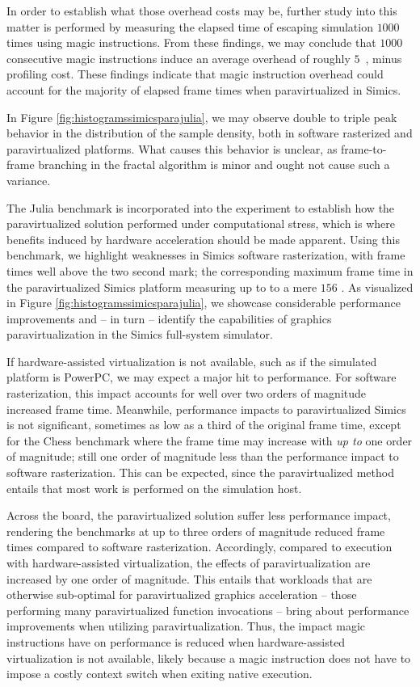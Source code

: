 \documentclass{article}
\begin{document}
In order to establish what those overhead costs may be, further study into this matter is performed by measuring the elapsed time of escaping simulation $1000$ times using magic instructions.
From these findings, we may conclude that $1000$ consecutive magic instructions induce an average overhead of roughly $5$~\milli\second , minus profiling cost.
These findings indicate that magic instruction overhead could account for the majority of elapsed frame times when paravirtualized in Simics.

In Figure \ref{fig:histogramssimicsparajulia}, we may observe double to triple peak behavior in the distribution of the sample density, both in software rasterized and paravirtualized platforms.
What causes this behavior is unclear, as frame-to-frame branching in the fractal algorithm is minor and ought not cause such a variance.

The Julia benchmark is incorporated into the experiment to establish how the paravirtualized solution performed under computational stress, which is where benefits induced by hardware acceleration should be made apparent.
Using this benchmark, we highlight weaknesses in Simics software rasterization, with frame times well above the two second mark; the corresponding maximum frame time in the paravirtualized Simics platform measuring up to to a mere $156$ \milli\second .
As visualized in Figure \ref{fig:histogramssimicsparajulia}, we showcase considerable performance improvements and -- in turn -- identify the capabilities of graphics paravirtualization in the Simics full-system simulator.

If hardware-assisted virtualization is not available, such as if the simulated platform is PowerPC, we may expect a major hit to performance.
For software rasterization, this impact accounts for well over two orders of magnitude increased frame time.
Meanwhile, performance impacts to paravirtualized Simics is not significant, sometimes as low as a third of the original frame time, except for the Chess benchmark where the frame time may increase with \textit{up to} one order of magnitude; still one order of magnitude less than the performance impact to software rasterization.
This can be expected, since the paravirtualized method entails that most work is performed on the simulation host.

Across the board, the paravirtualized solution suffer less performance impact, rendering the benchmarks at up to three orders of magnitude reduced frame times compared to software rasterization.
Accordingly, compared to execution with hardware-assisted virtualization, the effects of paravirtualization are increased by one order of magnitude.
This entails that workloads that are otherwise sub-optimal for paravirtualized graphics acceleration -- those performing many paravirtualized function invocations -- bring about performance improvements when utilizing paravirtualization.
Thus, the impact magic instructions have on performance is reduced when hardware-assisted virtualization is not available, likely because a magic instruction does not have to impose a costly context switch when exiting native execution.
\end{document}
